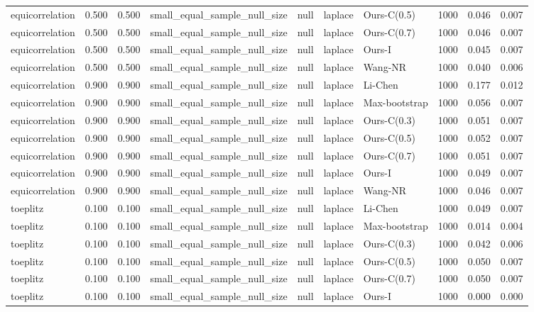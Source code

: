 \begin{tabular}{lrrllllrrr}
equicorrelation & 0.500 & 0.500 & small\_equal\_sample\_null\_size & null & laplace & Ours-C(0.5) & 1000 & 0.046 & 0.007 \\
equicorrelation & 0.500 & 0.500 & small\_equal\_sample\_null\_size & null & laplace & Ours-C(0.7) & 1000 & 0.046 & 0.007 \\
equicorrelation & 0.500 & 0.500 & small\_equal\_sample\_null\_size & null & laplace & Ours-I & 1000 & 0.045 & 0.007 \\
equicorrelation & 0.500 & 0.500 & small\_equal\_sample\_null\_size & null & laplace & Wang-NR & 1000 & 0.040 & 0.006 \\
equicorrelation & 0.900 & 0.900 & small\_equal\_sample\_null\_size & null & laplace & Li-Chen & 1000 & 0.177 & 0.012 \\
equicorrelation & 0.900 & 0.900 & small\_equal\_sample\_null\_size & null & laplace & Max-bootstrap & 1000 & 0.056 & 0.007 \\
equicorrelation & 0.900 & 0.900 & small\_equal\_sample\_null\_size & null & laplace & Ours-C(0.3) & 1000 & 0.051 & 0.007 \\
equicorrelation & 0.900 & 0.900 & small\_equal\_sample\_null\_size & null & laplace & Ours-C(0.5) & 1000 & 0.052 & 0.007 \\
equicorrelation & 0.900 & 0.900 & small\_equal\_sample\_null\_size & null & laplace & Ours-C(0.7) & 1000 & 0.051 & 0.007 \\
equicorrelation & 0.900 & 0.900 & small\_equal\_sample\_null\_size & null & laplace & Ours-I & 1000 & 0.049 & 0.007 \\
equicorrelation & 0.900 & 0.900 & small\_equal\_sample\_null\_size & null & laplace & Wang-NR & 1000 & 0.046 & 0.007 \\
toeplitz & 0.100 & 0.100 & small\_equal\_sample\_null\_size & null & laplace & Li-Chen & 1000 & 0.049 & 0.007 \\
toeplitz & 0.100 & 0.100 & small\_equal\_sample\_null\_size & null & laplace & Max-bootstrap & 1000 & 0.014 & 0.004 \\
toeplitz & 0.100 & 0.100 & small\_equal\_sample\_null\_size & null & laplace & Ours-C(0.3) & 1000 & 0.042 & 0.006 \\
toeplitz & 0.100 & 0.100 & small\_equal\_sample\_null\_size & null & laplace & Ours-C(0.5) & 1000 & 0.050 & 0.007 \\
toeplitz & 0.100 & 0.100 & small\_equal\_sample\_null\_size & null & laplace & Ours-C(0.7) & 1000 & 0.050 & 0.007 \\
toeplitz & 0.100 & 0.100 & small\_equal\_sample\_null\_size & null & laplace & Ours-I & 1000 & 0.000 & 0.000 \\

\end{tabular}
